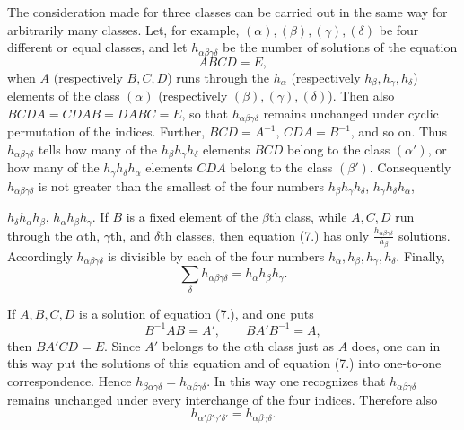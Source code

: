 \documentclass[11pt]{article}
\begin{document}
The consideration made for three classes can be carried out in the same way for arbitrarily many classes. Let, for example, $(\alpha),(\beta),(\gamma),(\delta)$ be four different or equal classes, and let $h_{\alpha\beta\gamma\delta}$ be the number of solutions of the equation
\begin{equation*}\tag{7.}
ABCD=E,
\end{equation*}
when $A$ (respectively $B,C,D$) runs through the $h_\alpha$ (respectively $h_\beta,h_\gamma,h_\delta$) elements of the class $(\alpha)$ (respectively $(\beta),(\gamma),(\delta)$). Then also $BCDA=CDAB=DABC=E$, so that $h_{\alpha\beta\gamma\delta}$ remains unchanged under cyclic permutation of the indices. Further, $BCD=A^{-1}$, $CDA=B^{-1}$, and so on. Thus $h_{\alpha\beta\gamma\delta}$ tells how many of the $h_\beta h_\gamma h_\delta$ elements $BCD$ belong to the class $(\alpha')$, or how many of the $h_\gamma h_\delta h_\alpha$ elements $CDA$ belong to the class $(\beta')$. Consequently $h_{\alpha\beta\gamma\delta}$ is not greater than the smallest of the four numbers $h_\beta h_\gamma h_\delta$, $h_\gamma h_\delta h_\alpha$,


$h_\delta h_\alpha h_\beta$, $h_\alpha h_\beta h_\gamma$. If $B$ is a fixed element of the $\beta$th class, while $A,C,D$ run through the $\alpha$th, $\gamma$th, and $\delta$th classes, then equation (7.) has only $\frac{h_{\alpha\beta\gamma\delta}}{h_\beta}$ solutions. Accordingly $h_{\alpha\beta\gamma\delta}$ is divisible by each of the four numbers $h_\alpha,h_\beta,h_\gamma,h_\delta$. Finally,
\begin{equation*}\tag{8.}
\sum_\delta h_{\alpha\beta\gamma\delta}=h_\alpha h_\beta h_\gamma.
\end{equation*}

If $A,B,C,D$ is a solution of equation (7.), and one puts
\[
B^{-1}AB=A',\qquad BA'B^{-1}=A,
\]
then $BA'CD=E$. Since $A'$ belongs to the $\alpha$th class just as $A$ does, one can in this way put the solutions of this equation and of equation (7.) into one-to-one correspondence. Hence $h_{\beta\alpha\gamma\delta}=h_{\alpha\beta\gamma\delta}$. In this way one recognizes that $h_{\alpha\beta\gamma\delta}$ remains unchanged under every interchange of the four indices. Therefore also
\begin{equation*}\tag{9.}
h_{\alpha'\beta'\gamma'\delta'}=h_{\alpha\beta\gamma\delta}.
\end{equation*}
\end{document}
